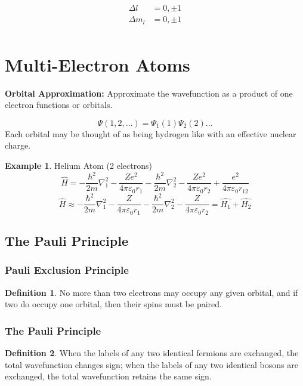 \documentclass[12pt]{article}
\theoremstyle{definition}
\newtheorem*{example}{Example}
\theoremstyle{definition}
\newtheorem*{defn}{Definition}
\begin{document}
\begin{align*}
	\Delta l &=  0, \pm 1 \\
	\Delta m_l &=  0, \pm 1 \\
\end{align*}

\section{Multi-Electron Atoms}

\textbf{Orbital Approximation:} Approximate the wavefunction as a product of one electron functions or orbitals.

\[
	\Psi(1, 2, \dots) = \Psi_1(1)\Psi_2(2) \dots
\]
Each orbital may be thought of as being hydrogen like with an effective nuclear charge.

\begin{example} Helium Atom (2 electrons)
	\[
		\hat{H} = - \frac{\hbar^2}{2m} \nabla^2_1 - \frac{Ze^2}{4 \pi \varepsilon_0r_1} - \frac{\hbar^2}{2m}\nabla^2_2 - \frac{Ze^2}{4\pi\varepsilon_0 r_2} + \frac{e^2}{4\pi\varepsilon_0 r_{12}} 
	\]
	\[
		\hat{H} \approx - \frac{\hbar^2}{2m} \nabla^2_1 - \frac{Z}{4\pi\varepsilon_0 r_1} - \frac{\hbar^2}{2m}\nabla^2_2 - \frac{Z}{4\pi\varepsilon_0 r_2} = \hat{H_1} + \hat{H_2}
	\]

\end{example}

\subsection{The Pauli Principle}

\subsubsection{Pauli Exclusion Principle}
\begin{defn}
	No more than two electrons may occupy any given orbital, and if two do occupy one orbital, then their spins must be paired.
\end{defn}

\subsubsection{The Pauli Principle}
\begin{defn}
	When the labels of any two identical fermions are exchanged, the total wavefunction changes sign; when the labels of any two identical bosons are exchanged, the total wavefunction retains the same sign.
\end{defn}
\end{document}
